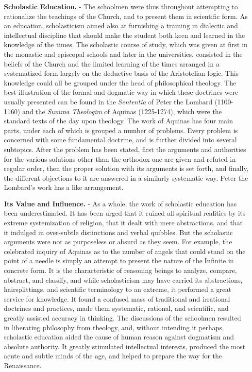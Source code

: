 \documentclass[
]{book}
\begin{document}
\textbf{Scholastic Education.} - The schoolmen were thus throughout attempting to rationalize the teachings of the Church, and to present them in scientific form. As an education, scholasticism aimed also at furnishing a training in dialectic and intellectual discipline that should make the student both keen and learned in the knowledge of the times. The scholastic course of study, which was given at first in the monastic and episcopal schools and later in the universities, consisted in the beliefs of the Church and the limited learning of the times arranged in a systematized form largely on the deductive basis of the Aristotelian logic. This knowledge could all be grouped under the head of philosophical theology. The best illustration of the formal and dogmatic way in which these doctrines were usually presented can be found in the \emph{Sententia} of Peter the Lombard (1100-1160) and the \emph{Summa Theologim} of Aquinas (1225-1274), which were the standard texts of the day upon theology. The work of Aquinas has four main parts, under each of which is grouped a number of problems. Every problem is concerned with some fundamental doctrine, and is further divided into several subtopics. After the problem has been stated, first the arguments and authorities for the various solutions other than the orthodox one are given and refuted in regular order, then the proper solution with its arguments is set forth, and finally, the different objections to it are answered in a similarly systematic way. Peter the Lombard's work has a like arrangement.

\textbf{Its Value and Influence.} - As a whole, the work of scholastic education has been underestimated. It has been urged that it ruined all spiritual realities by its extreme systemization of religion, that it dealt with mere abstractions, and that it indulged in over-subtle distinctions and verbal quibbles. But the scholastic arguments were not as purposeless or absurd as they seem. For example, the celebrated inquiry of Aquinas as to the number of angels that could stand on the point of a needle is simply an attempt to present the nature of the Infinite in concrete form. It is the characteristic of reasoning beings to analyze, compare, abstract, and classify, and while scholasticism may have carried its abstractions, hairsplittings, and scientific terminology to an extreme, it performed a great service for knowledge. It found a confused mass of traditional and irrational doctrines and practices, made them systematic, rational, and scientific, and greatly assisted accuracy in thinking. The discussions of the schoolmen resulted in liberating philosophy from theology, and, without intending it perhaps, scholastic education aided the cause of human reason against dogmatism and absolute authority. It greatly stimulated intellectual interests, produced the most acute and subtle minds of the age, and helped to prepare the way for the Renaissance.
\end{document}
